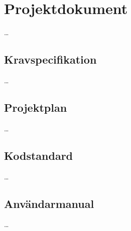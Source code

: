 \section{Projektdokument}
\ldots
\subsection{Kravspecifikation}
\ldots
\subsection{Projektplan}
\ldots
\subsection{Kodstandard}
\ldots
\subsection{Användarmanual}
\ldots